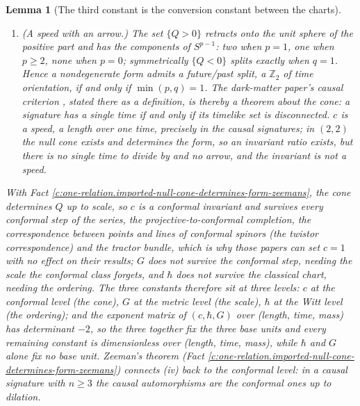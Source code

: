 \documentclass[11pt]{article}
\newtheorem{lemma}[theorem]{Lemma}
\theoremstyle{definition}
\theoremstyle{plain}
\begin{document}
\begin{lemma}[The third constant is the conversion constant between the charts]
\begin{enumerate}
\item[(iv)] \emph{(A speed with an arrow.)} The set $\{Q > 0\}$ retracts onto the unit sphere of the positive part and has the components of $S^{p-1}$: two when $p = 1$, one when $p \geq 2$, none when $p = 0$; symmetrically $\{Q < 0\}$ splits exactly when $q = 1$. Hence a nondegenerate form admits a future/past split, a $\mathbb{Z}_{2}$ of time orientation, if and only if $\min(p, q) = 1$. The dark-matter paper's causal criterion \cite[Prop.~3.1]{ButlerT14}, stated there as a definition, is thereby a theorem about the cone: a signature has a single time if and only if its timelike set is disconnected. $c$ is a speed, a length over one time, precisely in the causal signatures; in $(2,2)$ the null cone exists and determines the form, so an invariant ratio exists, but there is no single time to divide by and no arrow, and the invariant is not a speed.
\end{enumerate}
With Fact \ref{c:one-relation.imported-null-cone-determines-form-zeemans}, the cone determines $Q$ up to scale, so $c$ is a conformal invariant and survives every conformal step of the series, the projective-to-conformal completion, the correspondence between points and lines of conformal spinors (the twistor correspondence) and the tractor bundle, which is why those papers can set $c = 1$ with no effect on their results; $G$ does not survive the conformal step, needing the scale the conformal class forgets, and $\hbar$ does not survive the classical chart, needing the ordering. The three constants therefore sit at three levels: $c$ at the conformal level (the cone), $G$ at the metric level (the scale), $\hbar$ at the Witt level (the ordering); and the exponent matrix of $(c, \hbar, G)$ over (length, time, mass) has determinant $-2$, so the three together fix the three base units and every remaining constant is dimensionless over (length, time, mass), while $\hbar$ and $G$ alone fix no base unit. Zeeman's theorem (Fact \ref{c:one-relation.imported-null-cone-determines-form-zeemans}) connects (iv) back to the conformal level: in a causal signature with $n \geq 3$ the causal automorphisms are the conformal ones up to dilation.
\end{lemma}
\end{document}
